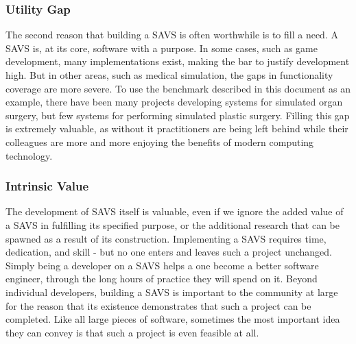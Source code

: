 \subsubsection{Utility Gap}

The second reason that building a SAVS is often worthwhile is to fill
a need. A SAVS is, at its core, software with a purpose. In some
cases, such as game development, many implementations exist, making
the bar to justify development high. But in other areas, such as
medical simulation, the gaps in functionality coverage are more
severe. To use the benchmark described in this document as an example,
there have been many projects developing systems for simulated organ
surgery, but few systems for performing simulated plastic
surgery. Filling this gap is extremely valuable, as without it
practitioners are being left behind while their colleagues are
more and more enjoying the benefits of modern computing technology.

\subsubsection{Intrinsic Value}

The development of SAVS itself is valuable, even if we ignore the
added value of a SAVS in fulfilling its specified purpose, or the
additional research that can be spawned as a result of its
construction.  Implementing a SAVS requires time, dedication, and
skill - but no one enters and leaves such a project unchanged. Simply
being a developer on a SAVS helps a one become a better software
engineer, through the long hours of practice they will spend on
it. Beyond individual developers, building a SAVS is important to the
community at large for the reason that its existence demonstrates that
such a project can be completed. Like all large pieces of software,
sometimes the most important idea they can convey is that such a
project is even feasible at all.

